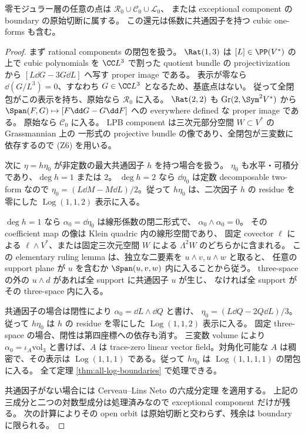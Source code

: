 \begin{theorem}[零層の残余]
\label{thm:zero-residual-exceptional}
零モジュラー層の任意の点は $\mathcal R_0\cup\mathcal C_0\cup\mathcal L_0$、
または exceptional component の boundary の原始切断に属する。
この還元は係数に共通因子を持つ cubic one-forms も含む。
\end{theorem}
\begin{proof}
まず rational components の閉包を扱う。
$\Rat(1,3)$ は $[L]\in\PP(V^*)$ の上で cubic polynomials を
$\CC L^3$ で割った quotient bundle の projectivization から
$[L\dd G-3G\dd L]$ へ写す proper image である。
表示が零なら $\dd(G/L^3)=0$、すなわち $G\in\CC L^3$ となるため、基底点はない。
従って全閉包がこの表示を持ち、原始なら $\mathcal R_0$ に入る。
$\Rat(2,2)$ も $\operatorname{Gr}(2,\Sym^2V^*)$ から
$\Span(F,G)\mapsto[F\dd G-G\dd F]$ への everywhere defined な proper image である。
原始なら $\mathcal C_0$ に入る。
LPB component は三次元部分空間 $W\subset V^*$ の Grassmannian 上の
一形式の projective bundle の像であり、全閉包が三変数に依存するので (Z6) を用いる。

次に $\eta=h\eta_0$ が非定数の最大共通因子 $h$ を持つ場合を扱う。
$\eta_0$ も水平・可積分であり、$\deg h=1$ または $2$。
$\deg h=2$ なら $\dd\eta_0$ は定数 decomposable two-form なので
$\eta_0=(L\dd M-M\dd L)/2$。従って $h\eta_0$ は、二次因子 $h$ の residue を
零にした $\operatorname{Log}(1,1,2)$ 表示に入る。

$\deg h=1$ なら $\alpha_0=\dd\eta_0$ は線形係数の閉二形式で、
$\alpha_0\wedge\alpha_0=0$。
その coefficient map の像は Klein quadric 内の線形空間であり、
固定 covector $\ell$ による $\ell\wedge V^*$、または固定三次元空間 $W$ による
$\Lambda^2W$ のどちらかに含まれる。
この elementary ruling lemma は、独立な二要素を $u\wedge v,u\wedge w$ と取ると、
任意の support plane が $u$ を含むか $\Span(u,v,w)$ 内に入ることから従う。
three-space の外の $u\wedge d$ があれば全 support に共通因子 $u$ が生じ、
なければ全 support がその three-space 内に入る。

共通因子の場合は閉性により $\alpha_0=\dd L\wedge\dd Q$ と書け、
$\eta_0=(L\dd Q-2Q\dd L)/3$。従って $h\eta_0$ は $h$ の residue を零にした
$\operatorname{Log}(1,1,2)$ 表示に入る。
固定 three-space の場合、閉性は第四座標への依存も消す。
三変数 volume により $\alpha_0=\iota_A\mathrm{vol}_3$ と書けば、$A$ は trace-zero
linear vector field。対角化可能な $A$ は稠密で、その表示は
$\operatorname{Log}(1,1,1)$ である。従って $h\eta_0$ は
$\operatorname{Log}(1,1,1,1)$ の閉包に入る。
全て定理 \ref{thm:all-log-boundaries} で処理できる。

共通因子がない場合には Cerveau--Lins Neto の六成分定理
\cite{CLN96} を適用する。
上記の三成分と二つの対数型成分は処理済みなので exceptional component だけが残る。
次の計算によりその open orbit は原始切断と交わらず、残余は boundary に限られる。
\end{proof}

